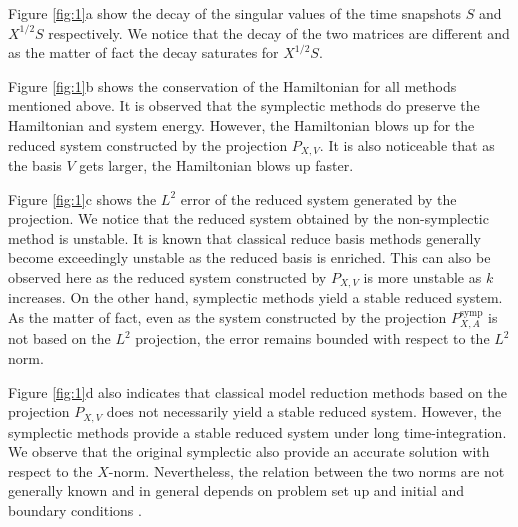 Figure \ref{fig:1}a show the decay of the singular values of the time snapshots $S$ and $X^{1/2}S$ respectively. We notice that the decay of the two matrices are different and as the matter of fact the decay saturates for $X^{1/2}S$.

Figure \ref{fig:1}b shows the conservation of the Hamiltonian for all methods mentioned above. It is observed that the symplectic methods do preserve the Hamiltonian and system energy. However, the Hamiltonian blows up for the reduced system constructed by the projection $P_{X,V}$. It is also noticeable that as the basis $V$ gets larger, the Hamiltonian blows up faster.

Figure \ref{fig:1}c shows the $L^2$ error of the reduced system generated by the projection. We notice that the reduced system obtained by the non-symplectic method is unstable. It is known that classical reduce basis methods generally become exceedingly unstable as the reduced basis is enriched. This can also be observed here as the reduced system constructed by $P_{X,V}$ is more unstable as $k$ increases. On the other hand, symplectic methods yield a stable reduced system. As the matter of fact, even as the system constructed by the projection $P^{\text{symp}}_{X,A}$ is not based on the $L^2$ projection, the error remains bounded with respect to the $L^2$ norm. 

Figure \ref{fig:1}d also indicates that classical model reduction methods based on the projection $P_{X,V}$ does not necessarily yield a stable reduced system. However, the symplectic methods provide a stable reduced system under long time-integration. We observe that the original symplectic also provide an accurate solution with respect to the $X$-norm. Nevertheless, the relation between the two norms are not generally known and in general depends on problem set up and initial and boundary conditions \cite{DEPARIS20094359}.

